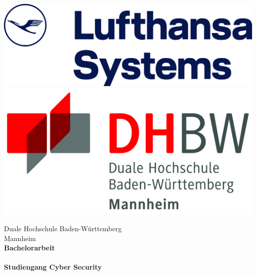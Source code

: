 \begin{titlepage}
    \begin{minipage}{\textwidth}
            \vspace{-2cm}
            \noindent
            \includegraphics[scale=0.035]{img/Uzletiforditas.hu-Lufthansa.png} 
             \hfill   
             \includegraphics{img/logo.jpg}
    \end{minipage}
    
    \vspace{4em}
    \sffamily
    \begin{center}
        \textsf{\large{}Duale Hochschule Baden-W\"urttemberg\\[1.5mm] Mannheim}\\[2em]
        \textsf{\textbf{\Large{}Bachelorarbeit}}\\[3mm]
        \vspace{5em}
        \textsf{\textbf{\Large{\DerTitelDerArbeit}}} \\[1.5cm]
        \vspace{5em}
        \textsf{\textbf{Studiengang Cyber Security}\\[3mm]}
        
        \vspace{3em}
    \vfill
    
    \begin{minipage}{\textwidth}
    

\end{minipage}
\end{center}
\end{titlepage}
